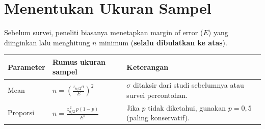\documentclass[
  indonesian,
  letterpaper,
]{book}
\newcounter{none} %
\begin{document}
\section{Menentukan Ukuran Sampel}\label{menentukan-ukuran-sampel}

Sebelum survei, peneliti biasanya menetapkan margin of error (\(E\))
yang diinginkan lalu menghitung \(n\) minimum (\textbf{selalu dibulatkan
ke atas}).

{\def\LTcaptype{none} %
\begin{longtable}[]{@{}
  >{\raggedright\arraybackslash}p{}
  >{\raggedright\arraybackslash}p{}
  >{\raggedright\arraybackslash}p{}@{}}
\toprule\noalign{}
\begin{minipage}[b]{\linewidth}\raggedright
Parameter
\end{minipage} & \begin{minipage}[b]{\linewidth}\raggedright
Rumus ukuran sampel
\end{minipage} & \begin{minipage}[b]{\linewidth}\raggedright
Keterangan
\end{minipage} \\
\midrule\noalign{}
\endhead
\bottomrule\noalign{}
\endlastfoot
Mean & \(\displaystyle n = \left(\frac{z_{\alpha/2}\sigma}{E}\right)^2\)
& \(\sigma\) ditaksir dari studi sebelumnya atau survei percontohan. \\
Proporsi & \(\displaystyle n = \frac{z_{\alpha/2}^{\,2}\,p(1-p)}{E^2}\)
& Jika \(p\) tidak diketahui, gunakan \(p=0{,}5\) (paling
konservatif). \\
\end{longtable}
}
\end{document}
